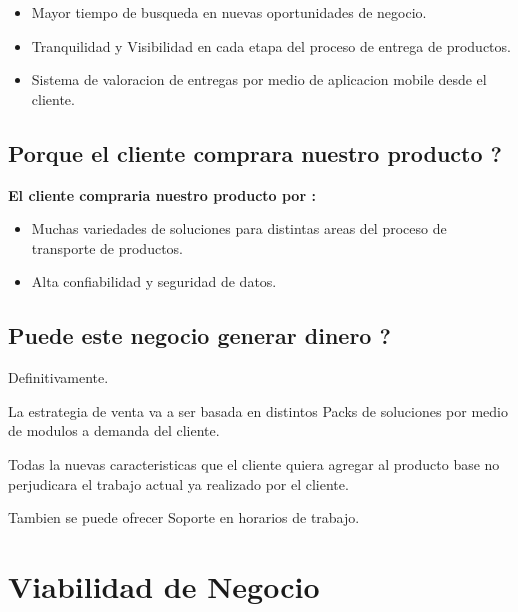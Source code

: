 \documentclass[
10pt, %
a4paper, %
oneside, %
headinclude,footinclude, %
BCOR5mm, %
]{scrartcl}
\begin{document}
\begin{itemize}
    \item { Mayor tiempo de busqueda en nuevas oportunidades de negocio. }
    \item { Tranquilidad y Visibilidad en cada etapa del proceso de entrega
              de productos. }
    \item { Sistema de valoracion de entregas por medio de aplicacion mobile
        desde el cliente. }
\end{itemize}

\subsection{Porque el cliente comprara nuestro producto ?}
\textbf {El cliente compraria nuestro producto por :}

\begin{itemize}
    \item { Muchas variedades de soluciones para distintas areas del proceso
              de transporte de productos. }
    \item { Alta confiabilidad y seguridad de datos. }
\end{itemize}

\subsection{Puede este negocio generar dinero ?}
  Definitivamente.

  La estrategia de venta va a ser basada en
  distintos Packs de soluciones por medio de modulos
  a demanda del cliente.

  Todas la nuevas caracteristicas que el cliente quiera agregar
  al producto base no perjudicara el trabajo actual ya realizado
  por el cliente.

  Tambien se puede ofrecer Soporte en horarios de trabajo.

\pagebreak

\section {Viabilidad de Negocio}
\end{document}
